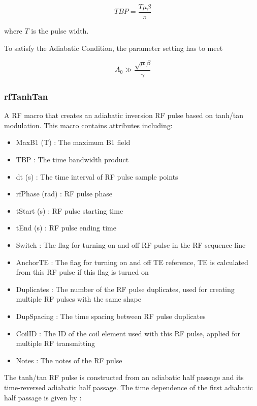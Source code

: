 \documentclass{book}%
\begin{document}
\begin{equation}\
TBP = \frac{T\mu \beta}{\pi}
\label{eq:TBPHyperbolicSecant}
\end{equation}

where $T$ is the pulse width.

To satisfy the Adiabatic Condition, the parameter setting has to meet 

\begin{equation}\
A_0 \gg \frac{\sqrt{\mu}\beta}{\gamma}
\label{eq:ACHyperbolicSecant}
\end{equation}

\subsubsection{rfTanhTan}

A RF macro that creates an adiabatic inversion RF pulse based on tanh/tan modulation. This macro contains attributes including:

\begin{itemize}
	\item MaxB1 (T) : The maximum B1 field
	\item TBP : The time bandwidth product
	\item dt (s) : The time interval of RF pulse sample points
	\item rfPhase (rad) : RF pulse phase
	\item tStart (s) : RF pulse starting time
	\item tEnd (s) : RF pulse ending time
	\item Switch : The flag for turning on and off RF pulse in the RF sequence line
	\item AnchorTE : The flag for turning on and off TE reference, TE is calculated from this RF pulse if this flag is turned on
	\item Duplicates : The number of the RF pulse duplicates, used for creating multiple RF pulses with the same shape
	\item DupSpacing : The time spacing between RF pulse duplicates
	\item CoilID : The ID of the coil element used with this RF pulse, applied for multiple RF transmitting
	\item Notes : The notes of the RF pulse 
\end{itemize}

The tanh/tan RF pulse is constructed from an adiabatic half passage and its time-reversed adiabatic half passage. The time dependence of the first adiabatic half passage is given by \cite{Hwang1998}:
\end{document}
